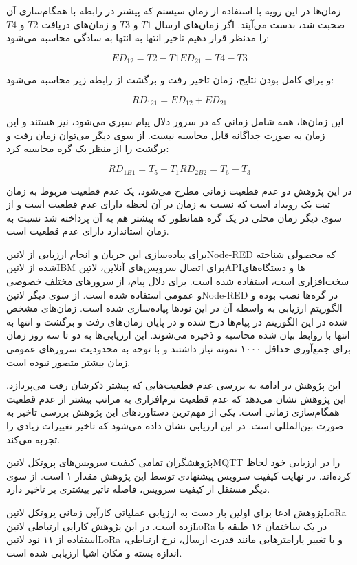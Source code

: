 زمان‌ها در این رویه با استفاده از زمان سیستم که پیشتر در رابطه با همگام‌سازی آن صحبت شد، بدست می‌آیند.
اگر زمان‌های ارسال $T1$ و $T3$ و زمان‌های دریافت $T2$ و $T4$ را مدنظر قرار دهیم تاخیر انتها به انتها به سادگی محاسبه می‌شود:

\[
  ED_{12} = T2 - T1
  ED_{21} = T4 - T3
\]

و برای کامل بودن نتایج، زمان تاخیر رفت و برگشت از رابطه زیر محاسبه می‌شود:

\[
  RD_{121} = ED_{12} + ED_{21}
\]

این زمان‌ها، همه شامل زمانی که در سرور دلال پیام سپری می‌شود، نیز هستند و این زمان به صورت جداگانه قابل محاسبه نیست.
از سوی دیگر می‌توان زمان رفت و برگشت را از منظر یک گره محاسبه کرد:

\[
  RD_{1B1} = T_{5} - T_{1}
  RD_{2B2} = T_{6} - T_{3}
\]

در این پژوهش دو عدم قطعیت زمانی مطرح می‌شود، یک عدم قطعیت مربوط به زمان ثبت یک رویداد است که نسبت به زمان در آن لحظه دارای عدم قطعیت است و از سوی
دیگر زمان محلی در یک گره همانطور که پیشتر هم به آن پرداخته شد نسبت به زمان استاندارد دارای عدم قطعیت است.

برای پیاده‌سازی این جریان و انجام ارزیابی از ‌لاتین{Node-RED} که محصولی شناخته شده از ‌لاتین{IBM} برای اتصال سرویس‌های آنلاین، ‌لاتین{API}ها و
دستگاه‌های سخت‌افزاری است، استفاده شده است. برای دلال پیام، از سرور‌های مختلف خصوصی و عمومی استفاده شده است.
از سوی دیگر ‌لاتین{Node-RED} در گره‌ها نصب بوده و الگوریتم ارزیابی به واسطه آن در این نودها پیاده‌سازی شده است.
زمان‌های مشخص شده در این الگوریتم در پیام‌ها درج شده و در پایان زمان‌های رفت و برگشت و انتها به انتها با روابط بیان شده محاسبه و ذخیره می‌شوند.
این ارزیابی‌ها به دو تا سه روز زمان برای جمع‌آوری حداقل ۱۰۰۰ نمونه نیاز داشتند و با توجه به محدودیت سرورهای عمومی زمان بیشتر متصور نبوده است.

این پژوهش در ادامه به بررسی عدم قطعیت‌هایی که پیشتر ذکرشان رفت می‌پردازد. این پژوهش نشان می‌دهد که عدم قطعیت نرم‌افزاری به مراتب
بیشتر از عدم قطعیت همگام‌سازی زمانی است. یکی از مهم‌ترین دستاوردهای این پژوهش بررسی تاخیر به صورت بین‌المللی است. در این ارزیابی
نشان داده می‌شود که تاخیر تغییرات زیادی را تجربه می‌کند.

پژوهشگران تمامی کیفیت سرویس‌های پروتکل ‌لاتین{MQTT} را در ارزیابی خود لحاظ کرده‌اند. در نهایت کیفیت سرویس پیشنهادی توسط
این پژوهش مقدار ۱ است. از سوی دیگر مستقل از کیفیت سرویس، فاصله تاثیر بیشتری بر تاخیر دارد.


پژوهش  ادعا برای اولین بار دست به ارزیابی عملیاتی کارآیی زمانی پروتکل ‌لاتین{LoRa} زده است.
در این پژوهش کارایی ارتباطی ‌لاتین{LoRa} در یک ساختمان ۱۶ طبقه با استفاده از ۱۱ نود ‌لاتین{LoRa}
و با تغییر پارامترهایی مانند قدرت ارسال، نرخ ارتباطی، اندازه بسته و مکان اشیا ارزیابی شده است.

